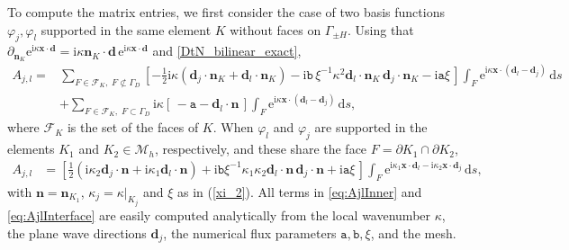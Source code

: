 \documentclass[a4paper,10pt]{article}
\newcommand{\bx}{{\mathbf x}}
\newcommand{\bd}{{\mathbf d}}
\newcommand{\bn}{{\mathbf n}}
\newcommand{\ri}{{\mathrm i}}
\newcommand{\re}{{\mathrm e}}
\newcommand{\rd}{{\,\mathrm d}}
\newcommand{\Mh}{{\mathcal M_h}}
\newcommand{\pa}{{\mathtt{a}}}
\newcommand{\pb}{{\mathtt{b}}}
\newcommand{\dnK}{{\partial_{\bn_K}}}
\newcommand{\GD}{{\Gamma_D}}
\newcommand{\GpmH}{{\Gamma_{\pm H}}}
\begin{document}
To compute the matrix entries, we first consider the case of two basis functions $\varphi_j,\varphi_l$ supported in the same element $K$ without faces on $\GpmH$.
Using that $\dnK \re^{\ri\kappa\bx\cdot\bd}=\ri\kappa\bn_K\cdot\bd\,\re^{\ri\kappa\bx\cdot\bd}$ and \eqref{DtN_bilinear_exact},
\begin{align}\nonumber
A_{j,l} = & \sum_{F\in \mathcal{F}_K, \; F\not\subset \GD} 
\left[ -\frac12\ri\kappa(\bd_j\cdot\bn_K+\bd_l\cdot\bn_K)
- \ri\pb\, \xi^{-1} \kappa^2 \bd_l\cdot\bn_K\,\bd_j\cdot\bn_K -\ri\pa  \xi \, \right] \int_{F} 
\re^{\ri\kappa\bx\cdot(\bd_l-\bd_j)} \rd s\\
& + \sum_{F\in \mathcal{F}_K, \; F\subset \GD}  \ri\kappa\left[ \,-\pa-\bd_l \cdot \bn \,\right] \int_{F} \re^{\ri\kappa\bx\cdot(\bd_l-\bd_j)} \rd s, 
\label{eq:AjlInner}
\end{align}
where $\mathcal{F}_K$ is the set of the faces of $K$.
When $\varphi_l$ and $\varphi_j$ are supported in the elements $K_1$ and $K_2\in\Mh$, respectively, and these share the face $F=\partial K_1\cap\partial K_2$, 
\begin{align}\label{eq:AjlInterface}
A_{j,l} & = \left[\frac12(\ri\kappa_2\bd_j\cdot\bn+\ri \kappa_1\bd_l\cdot\bn) 
+\ri\pb\xi^{-1} \kappa_1 \kappa_2\bd_l\cdot\bn\,\bd_j\cdot\bn 
+\ri\pa\xi\,\right] \int_F \re^{ \ri\kappa_1\bx\cdot\bd_l - \ri\kappa_2\bx\cdot\bd_j}\rd s,
\end{align}
with $\bn=\bn_{K_1}$, $\kappa_j=\kappa|_{K_j}$ and $\xi$ as in (\ref{xi_2}).
All terms in \eqref{eq:AjlInner} and \eqref{eq:AjlInterface} are easily computed analytically from the local wavenumber $\kappa$, the plane wave directions $\bd_j$, the numerical flux parameters $\pa,\pb,\xi$, and the mesh.
\end{document}

